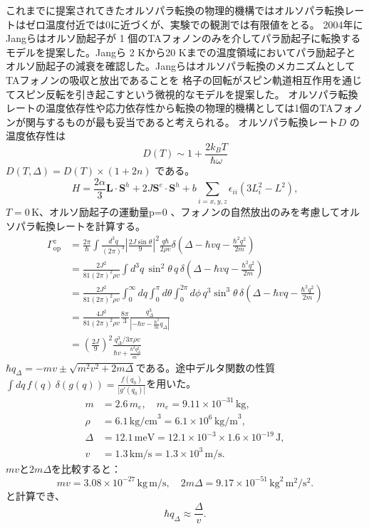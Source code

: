 これまでに提案されてきたオルソパラ転換の物理的機構ではオルソパラ転換レートはゼロ温度付近では0に近づくが、実験での観測では有限値をとる。
2004年にJangらはオルソ励起子が 1 個のTAフォノンのみを介してパラ励起子に転換するモデルを提案した。\cite{jang2004}Jangら
2 Kから20 Kまでの温度領域においてパラ励起子とオルソ励起子の減衰を確認した。Jangらはオルソパラ転換のメカニズムとしてTAフォノンの吸収と放出であることを
格子の回転がスピン軌道相互作用を通じてスピン反転を引き起こすという微視的なモデルを提案した。
オルソパラ転換レートの温度依存性や応力依存性から転換の物理的機構としては1個のTAフォノンが関与するものが最も妥当であると考えられる。
オルソパラ転換レート$D$ の温度依存性は
\[D(T) \sim 1 + \frac{2k_B T}{\hbar \omega}\]
$D(T, \Delta) = D(T) \times (1 + 2n)$
である。
\[
H = \frac{2\alpha}{3} \mathbf{L} \cdot \mathbf{S}^h + 2J \mathbf{S}^e \cdot \mathbf{S}^h 
+ b \sum_{i=x,y,z} \epsilon_{ii} \left( 3 L_i^2 - L^2 \right),
\]
$T = 0\,\mathrm{K}$、オルソ励起子の運動量p=0 、フォノンの自然放出のみを考慮してオルソパラ転換レートを計算する。
\begin{align}
\Gamma^{z}_{\mathrm{op}} &= \frac{2 \pi}{\hbar} \int \frac{d^3q}{(2 \pi)^3} \left| \frac{2J \sin \theta}{9} \right|^2 \frac{q \hbar}{2 \rho v} \delta \left( \Delta - \hbar v q - \frac{\hbar^2 q^2}{2m} \right) \\
&= \frac{2J^2}{81(2\pi)^2 \rho v} \int d^3q \, \sin^2 \theta \, q \, \delta \left( \Delta - \hbar v q - \frac{\hbar^2 q^2}{2m} \right)\\
&= \frac{2J^2}{81(2\pi)^2 \rho v} \int_0^\infty dq \int_0^\pi d\theta \int_0^{2\pi} d\phi \, 
q^3 \sin^3 \theta \, \delta \left( \Delta - \hbar v q - \frac{\hbar^2 q^2}{2m} \right)\\
&= \frac{4J^2}{81(2\pi)^2 \rho v} \frac{8\pi}{3} \frac{q_{\Delta}^3}{\left| - \hbar v - \frac{\hbar^2}{m} q_{\Delta}\right|}\\
&= \left( \frac{2J}{9} \right)^2 \frac{q_{\Delta}^3 / 3 \pi \rho v}{\hbar v + \frac{\hbar^2 q_{\Delta}^2}{m'}}
\end{align}
$\hbar q_{\Delta} = -m v \pm \sqrt{m^2 v^2 + 2 m \Delta}$である。途中デルタ関数の性質$\int dq \, f(q) \, \delta(g(q)) = \frac{f(q_0)}{\left| g'(q_0) \right|}$を用いた。
\begin{align*}
m &= 2.6 \, m_e, \quad m_e = 9.11 \times 10^{-31} \, \text{kg}, \\
\rho &= 6.1 \, \text{kg/cm}^3 = 6.1 \times 10^6 \, \text{kg/m}^3, \\
\Delta &= 12.1 \, \text{meV} = 12.1 \times 10^{-3} \times 1.6 \times 10^{-19} \, \text{J}, \\
v &= 1.3 \, \text{km/s} = 1.3 \times 10^3 \, \text{m/s}.
\end{align*}
$m v$と$2 m \Delta$を比較すると：
\[
m v = 3.08 \times 10^{-27} \, \text{kg} \, \text{m/s}, \quad 2 m \Delta = 9.17 \times 10^{-51} \, \text{kg}^2 \, \text{m}^2/\text{s}^2.
\]
と計算でき、
\[
\hbar q_{\Delta} \approx \frac{\Delta}{v}.
\]


